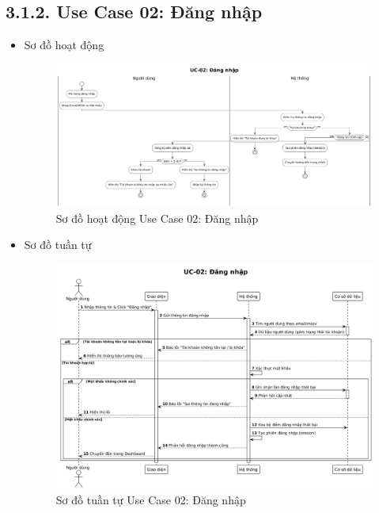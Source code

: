 \subsection*{3.1.2. Use Case 02: Đăng nhập}
\begin{itemize}
    \item Sơ đồ hoạt động
    \begin{figure}[H]
    \centering
    \includegraphics[scale=0.28 ]{Picture/ACUC02.png}
    \caption{Sơ đồ hoạt động Use Case 02: Đăng nhập}
    \end{figure}
    \item Sơ đồ tuần tự
    \begin{figure}[H]
    \centering
    \includegraphics[scale=0.35 ]{Picture/SEUC02.png}
    \caption{Sơ đồ tuần tự Use Case 02: Đăng nhập}
    \end{figure}
\end{itemize}
